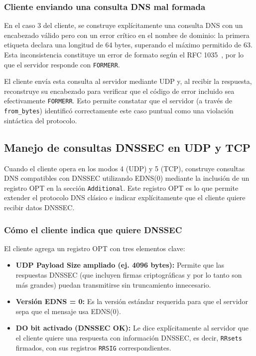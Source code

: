 \subsubsection{Cliente enviando una consulta DNS mal formada}

En el caso 3 del cliente, se construye explícitamente una consulta DNS con un encabezado válido pero con un error crítico en el nombre de dominio: la primera etiqueta declara una longitud de 64 bytes, 
superando el máximo permitido de 63. Esta inconsistencia constituye un error de formato según el RFC 1035~\cite{RFC1035}, por lo que el servidor responde con \texttt{FORMERR}.

El cliente envía esta consulta al servidor mediante UDP y, al recibir la respuesta, reconstruye su encabezado para verificar que el código de error incluido sea efectivamente \texttt{FORMERR}. 
Esto permite constatar que el servidor (a través de \texttt{from\_bytes}) identificó correctamente este caso puntual como una violación sintáctica del protocolo.

\subsection{Manejo de consultas DNSSEC en UDP y TCP}

Cuando el cliente opera en los modos 4 (UDP) y 5 (TCP), construye consultas DNS compatibles con DNSSEC utilizando EDNS(0) mediante la inclusión de un registro OPT en la sección \texttt{Additional}. 
Este registro OPT es lo que permite extender el protocolo DNS clásico e indicar explícitamente que el cliente quiere recibir datos DNSSEC.

\subsubsection{Cómo el cliente indica que quiere DNSSEC}

El cliente agrega un registro OPT con tres elementos clave:

\begin{itemize}
    \item \textbf{UDP Payload Size ampliado (ej. 4096 bytes):} Permite que las respuestas DNSSEC (que incluyen firmas criptográficas y por lo tanto son más grandes)
          puedan transmitirse sin truncamiento innecesario.
    \item \textbf{Versión EDNS = 0: } Es la versión estándar requerida para que el servidor sepa que el mensaje usa EDNS(0).  
    \item \textbf{DO bit activado (DNSSEC OK): } Le dice explícitamente al servidor que el cliente quiere una respuesta con información DNSSEC, es decir, 
          \texttt{RRsets} firmados, con sus registros \texttt{RRSIG} correspondientes.   
\end{itemize}

